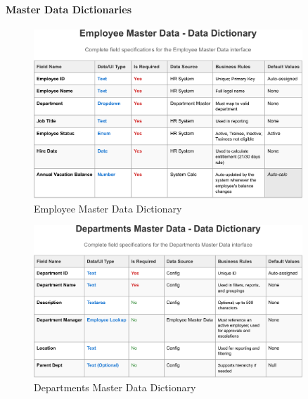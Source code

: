 \documentclass[12pt,a4paper]{article}
\begin{document}
\paragraph{Master Data Dictionaries}
\begin{figure}[H]
\centering
\includegraphics[width=0.9\textwidth]{Data-Dictionary/Master-Data-Dictionaries/Employee-Master-Data-Data-Dictionary/Employee-Master-Data-Data-Dictionary-1.png}
\caption{Employee Master Data Dictionary}
\label{fig:employee-master-data}
\end{figure}

\begin{figure}[H]
\centering
\includegraphics[width=0.9\textwidth]{Data-Dictionary/Master-Data-Dictionaries/Departments-Master-Data-Data-Dictionary/Departments-Master-Data-Data-Dictionary-1.png}
\caption{Departments Master Data Dictionary}
\label{fig:departments-master-data}
\end{figure}
\end{document}
